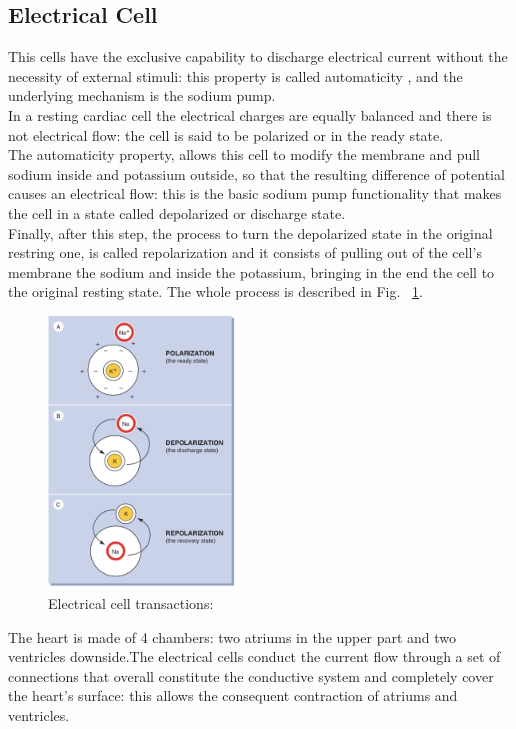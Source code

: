 \documentclass[LaM,binding=0.6cm]{sapthesis}
\begin{document}
\subsection{Electrical Cell}
This cells have the exclusive capability to discharge electrical current without the necessity of external stimuli: this property is called automaticity , and the underlying mechanism is the sodium pump.\\In a resting cardiac cell the electrical charges are equally balanced and there is not electrical flow: the cell is said to be polarized or in the ready state.\\The automaticity property, allows this cell to modify the membrane and pull sodium inside and potassium outside, so that the resulting difference of potential causes an electrical flow: this is the basic sodium pump functionality that makes the cell in a state called depolarized or discharge state.\\Finally, after this step, the process to turn the depolarized state in the original restring one, is called repolarization and it consists of pulling out of the cell's membrane the  sodium and inside the potassium, bringing in the end the cell to the original resting state. The whole process is described in Fig. ~\ref{fig:ecgtrans}.  
\begin{figure}[H]
	\includegraphics[width=50mm,scale=0.7]{ecgtrans}
	\caption{Electrical cell transactions: \cite{ecgbook}}
	\label{fig:ecgtrans}
\end{figure}
The heart is made of 4 chambers: two atriums in the upper part and two ventricles downside.The electrical cells conduct the current flow through a set of connections that overall constitute the conductive system and completely cover the heart's surface: this allows the consequent contraction of atriums and ventricles.
\end{document}
